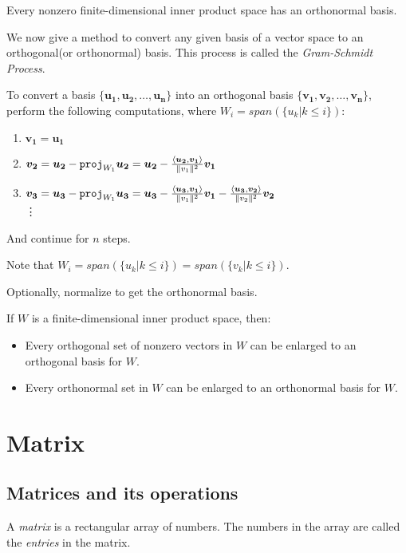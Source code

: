 \documentclass{report}
\begin{document}
		\begin{thm}
			Every nonzero finite-dimensional inner product space has an orthonormal basis.
		\end{thm}
		
		We now give a method to convert any given basis of a vector space to an orthogonal(or orthonormal) basis. This process is called the \emph{Gram-Schmidt Process}.
		
		\begin{mthd}\label{gram_schmidt_process}
			To convert a basis $\{\bm{u_1},\bm{u_2},\dots,\bm{u_n}\}$ into an orthogonal basis $\{\bm{v_1},\bm{v_2},\dots,\bm{v_n}\}$, perform the following computations, where $W_i=span(\{u_k|k \le i\})$:
			\begin{enumerate}
				\item $\bm{v_1}=\bm{u_1}$
				\item $\bm{v_2}=\bm{u_2}-\verb|proj|_{W_1}\bm{u_2}=\bm{u_2}-\frac{\left<\bm{u_2},\bm{v_1}\right>}{\|v_1\|^2}\bm{v_1}$
				\item $\bm{v_3}=\bm{u_3}-\verb|proj|_{W_1}\bm{u_3}=\bm{u_3}-\frac{\left<\bm{u_3},\bm{v_1}\right>}{\|v_1\|^2}\bm{v_1}-\frac{\left<\bm{u_3},\bm{v_2}\right>}{\|v_2\|^2}\bm{v_2}$
				\\ \vdots
			\end{enumerate}
			
			And continue for $n$ steps.
			
			Note that $W_i=span(\{u_k|k \le i\})=span(\{v_k|k \le i\})$.
			
			Optionally, normalize to get the orthonormal basis.
		\end{mthd}
		
		\begin{thm}
			If $W$ is a finite-dimensional inner product space, then:
			\begin{itemize}
				\item Every orthogonal set of nonzero vectors in $W$ can be enlarged to an orthogonal basis for $W$.
				\item Every orthonormal set in $W$ can be enlarged to an orthonormal basis for $W$.
			\end{itemize}
		\end{thm}
	
	\section{Matrix}
		\subsection{Matrices and its operations}
			\begin{defn}[Matrix]
				A \emph{matrix} is a rectangular array of numbers. The numbers in the array are called the \emph{entries} in the matrix.
			\end{defn}
		
\end{document}
